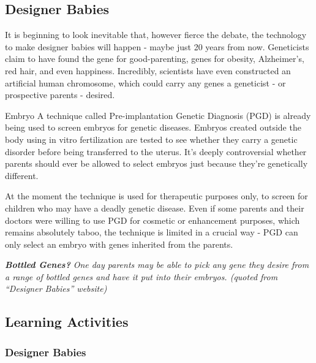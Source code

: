 \documentclass[
]{book}
\begin{document}
\hypertarget{designer-babies}{%
\subsection*{Designer Babies}\label{designer-babies}}

It is beginning to look inevitable that, however fierce the debate, the technology to make designer babies will happen - maybe just 20 years from now. Geneticists claim to have found the gene for good-parenting, genes for obesity, Alzheimer's, red hair, and even happiness. Incredibly, scientists have even constructed an artificial human chromosome, which could carry any genes a geneticist - or prospective parents - desired.

Embryo A technique called Pre-implantation Genetic Diagnosis (PGD) is already being used to screen embryos for genetic diseases. Embryos created outside the body using in vitro fertilization are tested to see whether they carry a genetic disorder before being transferred to the uterus. It's deeply controversial whether parents should ever be allowed to select embryos just because they're genetically different.

At the moment the technique is used for therapeutic purposes only, to screen for children who may have a deadly genetic disease. Even if some parents and their doctors were willing to use PGD for cosmetic or enhancement purposes, which remains absolutely taboo, the technique is limited in a crucial way - PGD can only select an embryo with genes inherited from the parents.

\textbf{\emph{Bottled Genes?}} \emph{One day parents may be able to pick any gene they desire from a range of bottled genes and have it put into their embryos. (quoted from ``Designer Babies'' website)}

\hypertarget{learning-activities}{%
\subsection*{Learning Activities}\label{learning-activities}}

\hypertarget{designer-babies-1}{%
\subsubsection*{Designer Babies}\label{designer-babies-1}}
\end{document}
